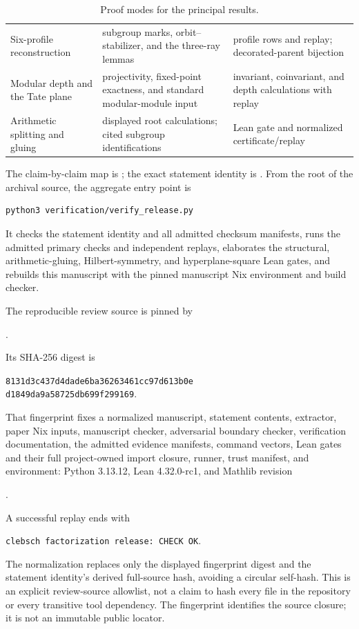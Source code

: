 \documentclass[11pt]{article}
\theoremstyle{definition}
\theoremstyle{remark}
\begin{document}
\begin{table}[ht]
\begin{tabular}{@{}>{\raggedright\arraybackslash}p{}
                    >{\raggedright\arraybackslash}p{}
                    >{\raggedright\arraybackslash}p{}@{}}
Six-profile reconstruction
& subgroup marks, orbit--stabilizer, and the three-ray lemmas
& profile rows and replay; decorated-parent bijection \\
Modular depth and the Tate plane
& projectivity, fixed-point exactness, and standard modular-module input
& invariant, coinvariant, and depth calculations with replay \\
Arithmetic splitting and gluing
& displayed root calculations; cited subgroup identifications
& Lean gate and normalized certificate/replay \\
\bottomrule
\end{tabular}
\caption{Proof modes for the principal results.}
\label{tab:verification}
\end{table}

The claim-by-claim map is
; the exact statement
identity is .  From the root
of the archival source, the aggregate entry point is
\begin{verbatim}
python3 verification/verify_release.py
\end{verbatim}
It checks the statement identity and all admitted checksum manifests, runs
the admitted primary checks and independent replays, elaborates the
structural, arithmetic-gluing, Hilbert-symmetry, and
hyperplane-square Lean gates, and rebuilds this manuscript with the pinned
manuscript Nix environment and build checker.

The reproducible review source is pinned by
\begin{center}
\small{}.
\end{center}
Its SHA-256 digest is
\begin{center}
\small\texttt{8131d3c437d4dade6ba36263461cc97d613b0e}\\[-2pt]
\texttt{d1849da9a58725db699f299169}.
\end{center}
That fingerprint fixes a normalized manuscript, statement contents,
extractor, paper Nix inputs, manuscript checker, adversarial boundary checker,
verification documentation, the admitted evidence manifests, command vectors,
Lean gates and their full project-owned import closure, runner, trust manifest, and
environment: Python 3.13.12, Lean
4.32.0-rc1, and Mathlib revision
\begin{center}
\small{}.
\end{center}
A successful replay ends with
\begin{center}
\texttt{clebsch factorization release: CHECK OK}.
\end{center}
The normalization replaces only the displayed fingerprint digest and
the statement identity's derived full-source hash, avoiding a circular
self-hash.  This is an explicit review-source allowlist, not a claim to
hash every file in the repository or every transitive tool dependency.
The fingerprint identifies the source closure; it is not an immutable
public locator.
\end{document}
